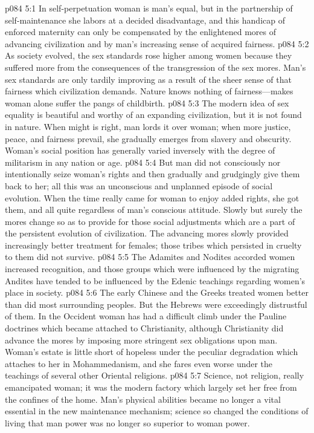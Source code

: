 \vs p084 5:1 In self\hyp{}perpetuation woman is man’s equal, but in the partnership of self\hyp{}maintenance she labors at a decided disadvantage, and this handicap of enforced maternity can only be compensated by the enlightened mores of advancing civilization and by man’s increasing sense of acquired fairness.
\vs p084 5:2 As society evolved, the sex standards rose higher among women because they suffered more from the consequences of the transgression of the sex mores. Man’s sex standards are only tardily improving as a result of the sheer sense of that fairness which civilization demands. Nature knows nothing of fairness---makes woman alone suffer the pangs of childbirth.
\vs p084 5:3 The modern idea of sex equality is beautiful and worthy of an expanding civilization, but it is not found in nature. When might is right, man lords it over woman; when more justice, peace, and fairness prevail, she gradually emerges from slavery and obscurity. Woman’s social position has generally varied inversely with the degree of militarism in any nation or age.
\vs p084 5:4 But man did not consciously nor intentionally seize woman’s rights and then gradually and grudgingly give them back to her; all this was an unconscious and unplanned episode of social evolution. When the time really came for woman to enjoy added rights, she got them, and all quite regardless of man’s conscious attitude. Slowly but surely the mores change so as to provide for those social adjustments which are a part of the persistent evolution of civilization. The advancing mores slowly provided increasingly better treatment for females; those tribes which persisted in cruelty to them did not survive.
\pc \vs p084 5:5 The Adamites and Nodites accorded women increased recognition, and those groups which were influenced by the migrating Andites have tended to be influenced by the Edenic teachings regarding women’s place in society.
\vs p084 5:6 The early Chinese and the Greeks treated women better than did most surrounding peoples. But the Hebrews were exceedingly distrustful of them. In the Occident woman has had a difficult climb under the Pauline doctrines which became attached to Christianity, although Christianity did advance the mores by imposing more stringent sex obligations upon man. Woman’s estate is little short of hopeless under the peculiar degradation which attaches to her in Mohammedanism, and she fares even worse under the teachings of several other Oriental religions.
\pc \vs p084 5:7 Science, not religion, really emancipated woman; it was the modern factory which largely set her free from the confines of the home. Man’s physical abilities became no longer a vital essential in the new maintenance mechanism; science so changed the conditions of living that man power was no longer so superior to woman power.
